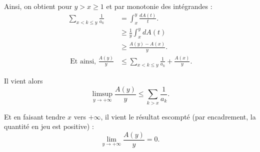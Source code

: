 Ainsi, on obtient pour $y>x\geq 1$ et par monotonie des intégrandes :
\begin{align*} 
\sum_{x<k\leq y}\frac{1}{a_{k}} & =\int_{x}^{y}\frac{dA(t)}{t}.\\
& \geq \frac{1}{y}\int_{x}^{y}dA(t)\\
& \geq \frac{A(y)-A(x)}{y}.\\
\mbox{ Et ainsi, } \frac{A(y)}{y} & \leq \sum_{x<k\leq y}\frac{1}{a_{k}}+ \frac{A(x)}{y}.
\end{align*}

Il vient alors $$\limsup_{y\rightarrow +\infty}\frac{A(y)}{y} \leq \sum_{k>x}\frac{1}{a_{k}}.$$

Et en faisant tendre $x$ vers $+\infty$, il vient le résultat escompté (par encadrement, la quantité en jeu est positive) : $$\lim_{y\rightarrow +\infty}\frac{A(y)}{y}=0.$$